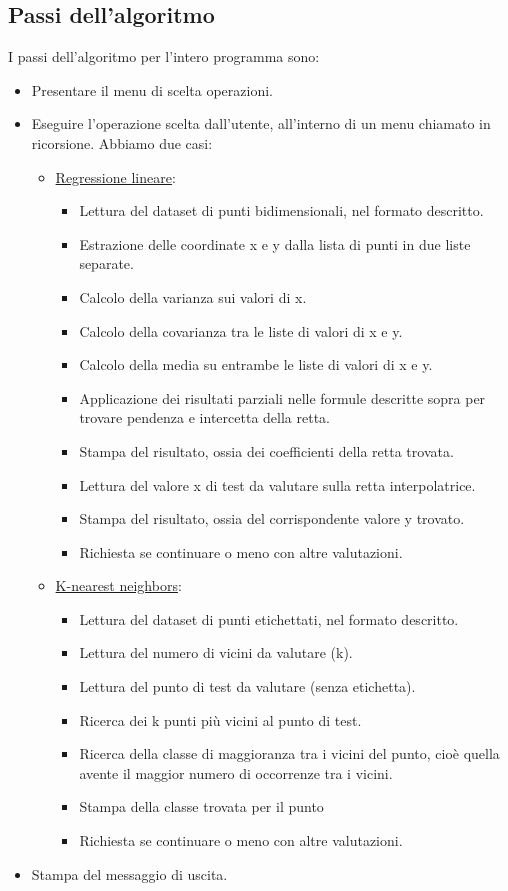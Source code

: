 \documentclass[11pt]{article}
\theoremstyle{definition}
\begin{document}
\subsection{Passi dell'algoritmo}
I passi dell'algoritmo per l'intero programma sono:
\begin{itemize}
\item Presentare il menu di scelta operazioni.
\item Eseguire l'operazione scelta dall'utente, all'interno di un menu chiamato in ricorsione. Abbiamo due casi:
\begin{itemize}
  \item \underline{Regressione lineare}: 
    \begin{itemize}
      \item Lettura del dataset di punti bidimensionali, nel formato descritto.
      \item Estrazione delle coordinate x e y dalla lista di punti in due liste separate.
      \item Calcolo della varianza sui valori di x.
      \item Calcolo della covarianza tra le liste di valori di x e y.
      \item Calcolo della media su entrambe le liste di valori di x e y.
      \item Applicazione dei risultati parziali nelle formule descritte sopra per trovare pendenza e intercetta della retta.
      \item Stampa del risultato, ossia dei coefficienti della retta trovata.
      \item Lettura del valore x di test da valutare sulla retta interpolatrice.
      \item Stampa del risultato, ossia del corrispondente valore y trovato. 
      \item Richiesta se continuare o meno con altre valutazioni.
    \end{itemize}
  \item \underline{K-nearest neighbors}: 
    \begin{itemize}
      \item Lettura del dataset di punti etichettati, nel formato descritto.
      \item Lettura del numero di vicini da valutare (k).
      \item Lettura del punto di test da valutare (senza etichetta).
      \item Ricerca dei k punti più vicini al punto di test.
      \item Ricerca della classe di maggioranza tra i vicini del punto, cioè quella avente il maggior numero di occorrenze tra i vicini.
      \item Stampa della classe trovata per il punto
      \item Richiesta se continuare o meno con altre valutazioni.
    \end{itemize}
\end{itemize}
\item Stampa del messaggio di uscita.
\end{itemize}
\end{document}
